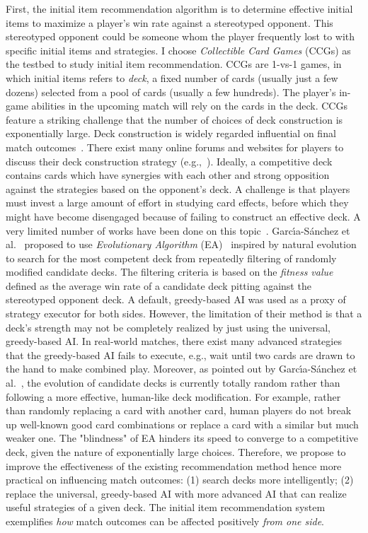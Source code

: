 First, the initial item recommendation algorithm is to determine effective initial items to maximize a player's win rate against a stereotyped opponent. This stereotyped opponent could be someone whom the player frequently lost to with specific initial items and strategies. I choose \textit{Collectible Card Games} (CCGs) as the testbed to study initial item recommendation. CCGs are 1-vs-1 games, in which initial items refers to \textit{deck}, a fixed number of cards (usually just a few dozens) selected from a pool of  cards (usually a few hundreds). The player's in-game abilities in the upcoming match will rely on the cards in the deck. CCGs feature a striking challenge that the number of choices of deck construction is exponentially large. Deck construction is widely regarded influential on final match outcomes~\cite{garcia2016evolutionary}. There exist many online forums and websites for players to discuss their deck construction strategy (e.g.,~\cite{hearthpwn,icyveins}). Ideally, a competitive deck contains cards which have synergies with each other and strong opposition against the strategies based on the opponent's deck. A challenge is that players must invest a large amount of effort in studying card effects, before which they might have become disengaged because of failing to construct an effective deck. A very limited number of works have been done on this topic~\cite{garcia2016evolutionary}. Garc{\'\i}a-S{\'a}nchez et al.~\cite{garcia2016evolutionary} proposed to use \textit{Evolutionary Algorithm} (EA)~\cite{eiben2003introduction} inspired by natural evolution to search for the most competent deck from repeatedly filtering of randomly modified candidate decks. The filtering criteria is based on the \textit{fitness value} defined as the average win rate of a candidate deck pitting against the stereotyped opponent deck. A default, greedy-based AI was used as a proxy of strategy executor for both sides. However, the limitation of their method is that a deck's strength may not be completely realized by just using the universal, greedy-based AI. In real-world matches, there exist many advanced strategies that the greedy-based AI fails to execute, e.g., wait until two cards are drawn to the hand to make combined play. Moreover, as pointed out by Garc{\'\i}a-S{\'a}nchez et al.~\cite{garcia2016evolutionary}, the evolution of candidate decks is currently totally random rather than following a more effective, human-like deck modification. For example, rather than randomly replacing a card with another card, human players do not break up well-known good card combinations  or replace a card with a similar but much weaker one. The "blindness" of EA hinders its speed to converge to a competitive deck, given the nature of exponentially large choices. Therefore, we propose to improve the effectiveness of the existing recommendation method hence more practical on influencing match outcomes: (1) search decks more intelligently; (2) replace the universal, greedy-based AI with more advanced AI that can realize useful strategies of a given deck. The initial item recommendation system exemplifies \textit{how} match outcomes can be affected positively \textit{from one side}.

